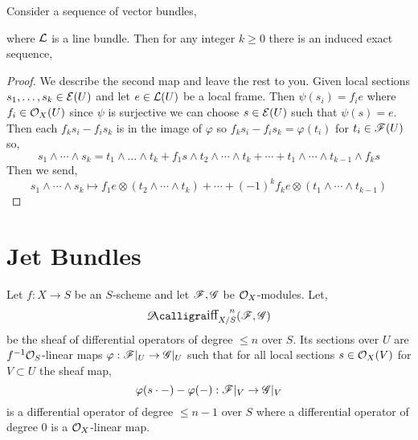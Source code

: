 \documentclass[12pt]{article}
\begin{document}
\begin{lemma}
Consider a sequence of vector bundles,
\begin{center}
\end{center}
where $\mathcal{L}$ is a line bundle. Then for any integer $k \ge 0$ there is an induced exact sequence,
\begin{center}
\end{center}
\end{lemma}

\begin{proof}
We describe the second map and leave the rest to you. Given local sections $s_1, \dots, s_k \in \mathcal{E}(U)$ and let $e \in \mathcal{L}(U)$ be a local frame. Then $\psi(s_i) = f_i e$ where $f_i \in \mathcal{O}_{X}(U)$ since $\psi$ is surjective we can choose $s \in \mathcal{E}(U)$ such that $\psi(s) = e$. Then each $f_k s_i - f_i s_k$ is in the image of $\varphi$ so $f_k s_i - f_i s_k = \varphi(t_i)$ for $t_i \in \mathscr{F}(U)$ so,
\[ s_1 \wedge \cdots \wedge s_k = t_1 \wedge \dots \wedge t_k + f_1 s \wedge t_2 \wedge \cdots \wedge t_k + \cdots + t_1 \wedge \cdots \wedge t_{k-1} \wedge f_k s \]
Then we send,
\[ s_1 \wedge \cdots \wedge s_k \mapsto f_1 e \otimes (t_2 \wedge \cdots \wedge t_k) + \cdots + (-1)^k f_k e \otimes (t_1 \wedge \cdots \wedge t_{k-1}) \]
\end{proof}

\section{Jet Bundles}


\begin{defn}
Let $f : X \to S$ be an $S$-scheme and let $\mathscr{F}, \mathscr{G}$ be $\mathcal{O}_{X}$-modules. Let,
\[ \shDiff{n}{X/S}{\F}{\G} \]
be the sheaf of differential operators of degree $\le n$ over $S$. Its sections over $U$ are $f^{-1} \mathcal{O}_{S}$-linear maps $\varphi : \mathscr{F}|_U \to \mathscr{G}|_U$ such that for all local sections $s \in \mathcal{O}_{X}(V)$ for $V \subset U$ the sheaf map,
\[ \varphi(s \cdot -) - \varphi(-) : \mathscr{F}|_V \to \mathscr{G}|_V \]
is a differential operator of degree $\le n - 1$ over $S$ where a differential operator of degree $0$ is a $\mathcal{O}_{X}$-linear map. 
\end{defn}
\end{document}
